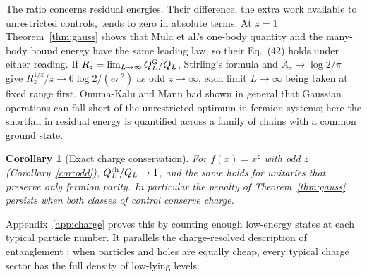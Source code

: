 \documentclass[11pt,a4paper]{article}
\newtheorem{corollary}[theorem]{Corollary}
\theoremstyle{remark}
\begin{document}
The ratio concerns residual energies. Their difference, the extra work available to unrestricted controls, tends to zero in absolute terms. At $z=1$ Theorem~\ref{thm:gauss} shows that Mula et al.'s one-body quantity and the many-body bound energy have the same leading law, so their Eq.~(42) holds under either reading. If $R_z=\lim_{L\to\infty}Q_L^{\rm G}/Q_L$, Stirling's formula and $A_z\to\log 2/\pi$ give $R_z^{1/z}/z\to 6\log 2/(e\pi^2)$ as odd $z\to\infty$, each limit $L\to\infty$ being taken at fixed range first. Onuma-Kalu and Mann \cite{onuma} had shown in general that Gaussian operations can fall short of the unrestricted optimum in fermion systems; here the shortfall in residual energy is quantified across a family of chains with a common ground state.

\begin{corollary}[Exact charge conservation]\label{cor:charge}
For $f(x)=x^z$ with odd $z$ (Corollary~\ref{cor:odd}), $Q_L^{\rm ch}/Q_L\to1$, and the same holds for unitaries that preserve only fermion parity. In particular the penalty of Theorem~\ref{thm:gauss} persists when both classes of control conserve charge.
\end{corollary}
Appendix~\ref{app:charge} proves this by counting enough low-energy states at each typical particle number. It parallels the charge-resolved description of entanglement \cite{goldstein}: when particles and holes are equally cheap, every typical charge sector has the full density of low-lying levels.
\end{document}
